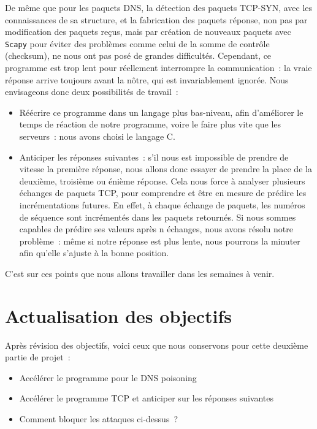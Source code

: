 \documentclass[a4paper, 12pt,twoside]{article}
\begin{document}
      De même que pour les paquets DNS, la détection des paquets TCP-SYN, avec les connaissances de sa structure, et la fabrication des paquets réponse, non pas par modification des paquets reçus, mais par création de nouveaux paquets avec \verb!Scapy! pour éviter des problèmes comme celui de la somme de contrôle (checksum), ne nous ont pas posé de grandes difficultés. Cependant, ce programme est trop lent pour réellement interrompre la communication~: la vraie réponse arrive toujours avant la nôtre, qui est invariablement ignorée. Nous envisageons donc deux possibilités de travail~:
  \begin{itemize}[label=\color{bleu303}\textbullet{}]
      \item Réécrire ce programme dans un langage plus bas-niveau, afin d'améliorer le temps de réaction de notre programme, voire le faire plus vite que les serveurs~: nous avons choisi le langage C.
      \item Anticiper les réponses suivantes~: s'il nous est impossible de prendre de vitesse la première réponse, nous allons donc essayer de prendre la place de la deuxième, troisième ou énième réponse. Cela nous force à analyser plusieurs échanges de paquets TCP, pour comprendre et être en mesure de prédire les incrémentations futures. En effet, à chaque échange de paquets, les numéros de séquence sont incrémentés dans les paquets retournés. Si nous sommes capables de prédire ses valeurs après n échanges, nous avons résolu notre problème~: même si notre réponse est plus lente, nous pourrons la minuter afin qu'elle s'ajuste à la bonne position.
  \end{itemize}


  C'est sur ces points que nous allons travailler dans les semaines à venir.
\newpage

\section{Actualisation des objectifs}%

    Après révision des objectifs, voici ceux que nous conservons pour cette deuxième partie de projet~:
    \begin{itemize}[label=\color{bleu303}\textbullet{}]
        \item Accélérer le programme pour le DNS poisoning
        \item Accélérer le programme TCP et anticiper sur les réponses suivantes
        \item Comment bloquer les attaques ci-dessus~?
    \end{itemize}
\end{document}

